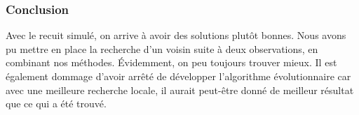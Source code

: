 \documentclass{beamer}
\begin{document}
\begin{frame}
    \frametitle{Conclusion}
    Avec le recuit simulé, on arrive à avoir des solutions plutôt bonnes. Nous avons pu mettre en place la recherche d'un voisin suite à deux observations, en combinant nos méthodes. Évidemment, on peu toujours trouver mieux. Il est également dommage d'avoir arrêté de développer l'algorithme évolutionnaire car avec une meilleure recherche locale, il aurait peut-être donné de meilleur résultat que ce qui a été trouvé. 
\end{frame}
\end{document}
